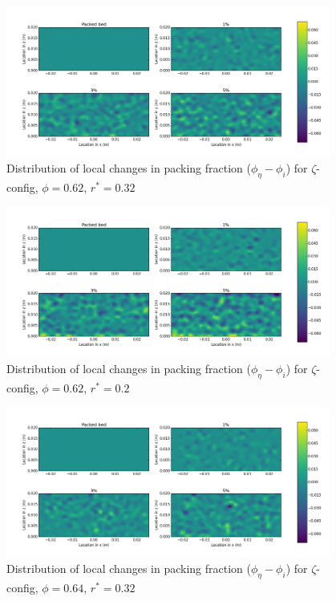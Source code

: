 \begin{figure}[!t]
    \centering
    \includegraphics[width = 0.95\textwidth]{figures/z-62-r23-1-deltas.png}
    \caption{Distribution of local changes in packing fraction ($\phi_{\eta} - \phi_i$) for $\zeta$-config, $\phi = 0.62$, $r^* = 0.32$}\label{fig:z-62-r23-deltas}
\end{figure}

\begin{figure}[!t]
    \centering
    \includegraphics[width = 0.95\textwidth]{figures/z-62-r125-1-deltas.png}
    \caption{Distribution of local changes in packing fraction ($\phi_{\eta} - \phi_i$) for $\zeta$-config, $\phi = 0.62$, $r^* = 0.2$}\label{fig:z-62-r125-deltas}
\end{figure}

\begin{figure}[!t]
    \centering
    \includegraphics[width = 0.95\textwidth]{figures/z-64-r23-1-deltas.png}
    \caption{Distribution of local changes in packing fraction ($\phi_{\eta} - \phi_i$) for $\zeta$-config, $\phi = 0.64$, $r^* = 0.32$}\label{fig:z-64-r23-deltas}
\end{figure}

